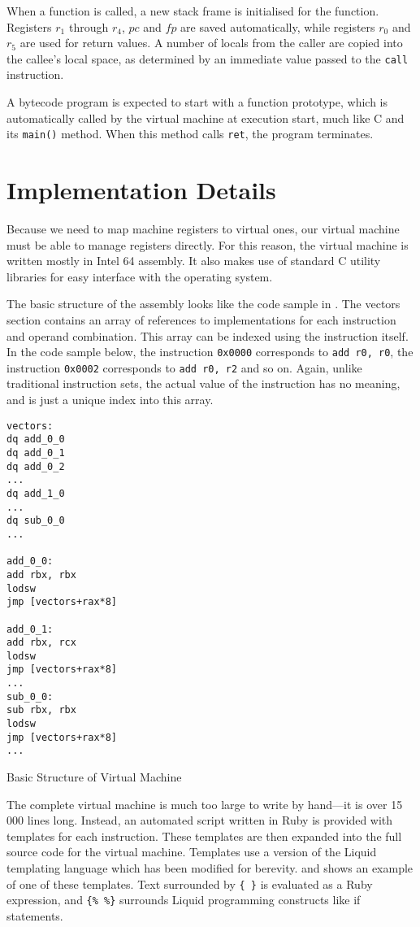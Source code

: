 		When a function is called, a new stack frame is initialised for the function. Registers $r_1$ through $r_4$, $pc$ and $fp$ are saved automatically, while registers $r_0$ and $r_5$ are used for return values. A number of locals from the caller are copied into the callee's local space, as determined by an immediate value passed to the \texttt{call} instruction.
		
		A bytecode program is expected to start with a function prototype, which is automatically called by the virtual machine at execution start, much like C and its \texttt{main()} method. When this method calls \texttt{ret}, the program terminates.
		
	\section{Implementation Details}
		Because we need to map machine registers to virtual ones, our virtual machine must be able to manage registers directly. For this reason, the virtual machine is written mostly in Intel 64 assembly. It also makes use of standard C utility libraries for easy interface with the operating system.
		
		The basic structure of the assembly looks like the code sample in . The vectors section contains an array of references to implementations for each instruction and operand combination. This array can be indexed using the instruction itself. In the code sample below, the instruction \texttt{0x0000} corresponds to \texttt{add r0, r0}, the instruction \texttt{0x0002} corresponds to \texttt{add r0, r2} and so on. Again, unlike traditional instruction sets, the actual value of the instruction has no meaning, and is just a unique index into this array.
		
		\begin{myfigure}
			\begin{lstlisting}
vectors:
dq add_0_0
dq add_0_1
dq add_0_2
...
dq add_1_0
...
dq sub_0_0
...

add_0_0:
add rbx, rbx
lodsw
jmp [vectors+rax*8]

add_0_1:
add rbx, rcx
lodsw
jmp [vectors+rax*8]
...
sub_0_0:
sub rbx, rbx
lodsw
jmp [vectors+rax*8]
...
			\end{lstlisting}
			\caption{Basic Structure of Virtual Machine}
			\label{fig:vmstructure}
		\end{myfigure}
		
		The complete virtual machine is much too large to write by hand---it is over 15 000 lines long. Instead, an automated script written in Ruby is provided with templates for each instruction. These templates are then expanded into the full source code for the virtual machine. Templates use a version of the Liquid templating language which has been modified for berevity.  and  shows an example of one of these templates. Text surrounded by \texttt{\{ \}} is evaluated as a Ruby expression, and \texttt{\{\% \%\}} surrounds Liquid programming constructs like if statements.
		
